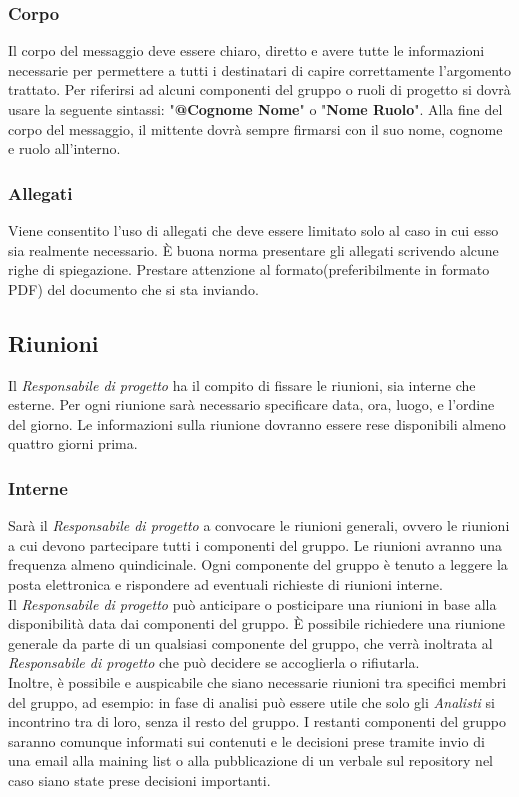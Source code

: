 		\subsubsection{Corpo}
Il corpo del messaggio deve essere chiaro, diretto e avere tutte le informazioni necessarie per permettere a tutti i destinatari di capire correttamente l'argomento trattato. Per riferirsi ad alcuni componenti del gruppo o ruoli di progetto si dovrà usare la seguente sintassi: "\textbf{@Cognome Nome}" o "\textbf{Nome Ruolo}". Alla fine del corpo del messaggio, il mittente dovrà sempre firmarsi con il suo nome, cognome e ruolo all'interno.
		\subsubsection{Allegati}
Viene consentito l'uso di allegati che deve essere limitato solo al caso in cui esso sia realmente necessario. È buona norma presentare gli allegati scrivendo alcune righe di spiegazione. Prestare attenzione al formato(preferibilmente in formato \gls{PDF}) del documento che si sta inviando. 

	\subsection{Riunioni}
Il \textit{Responsabile di progetto} ha il compito di fissare le riunioni, sia interne che esterne. Per ogni riunione sarà necessario specificare data, ora, luogo, e l'ordine del giorno. Le informazioni sulla riunione dovranno essere rese disponibili almeno quattro giorni prima.
		\subsubsection{Interne}
Sarà il \textit{Responsabile di progetto} a convocare le riunioni generali, ovvero le riunioni a cui devono partecipare tutti i componenti del gruppo. Le riunioni avranno una frequenza almeno quindicinale. Ogni componente del gruppo è tenuto a leggere la posta elettronica e rispondere ad eventuali richieste di riunioni interne. \\
Il \textit{Responsabile di progetto} può anticipare o posticipare una riunioni in base alla disponibilità data dai componenti del gruppo. È possibile richiedere una riunione generale da parte di un qualsiasi componente del gruppo, che verrà inoltrata al \textit{Responsabile di progetto} che può decidere se accoglierla o rifiutarla.\\
Inoltre, è possibile e auspicabile che siano necessarie riunioni tra specifici membri del gruppo, ad esempio: in fase di analisi può essere utile che solo gli \textit{Analisti} si incontrino tra di loro, senza il resto del gruppo. I restanti componenti del gruppo saranno comunque informati sui contenuti e le decisioni prese tramite invio di una email alla \gls{maining list} o alla pubblicazione di un \gls{verbale} sul \gls{repository} nel caso siano state prese decisioni importanti.
